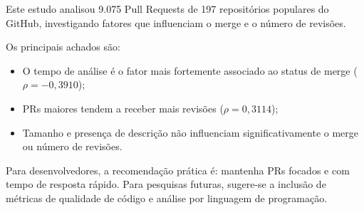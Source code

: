 Este estudo analisou 9.075 Pull Requests de 197 repositórios populares do GitHub,
investigando fatores que influenciam o merge e o número de revisões.

Os principais achados são:
\begin{itemize}
    \item O tempo de análise é o fator mais fortemente associado ao status de merge ($\rho = -0,3910$);
    \item PRs maiores tendem a receber mais revisões ($\rho = 0,3114$);
    \item Tamanho e presença de descrição não influenciam significativamente o merge ou número de revisões.
\end{itemize}

Para desenvolvedores, a recomendação prática é: mantenha PRs focados e com
tempo de resposta rápido. Para pesquisas futuras, sugere-se a inclusão de
métricas de qualidade de código e análise por linguagem de programação.
